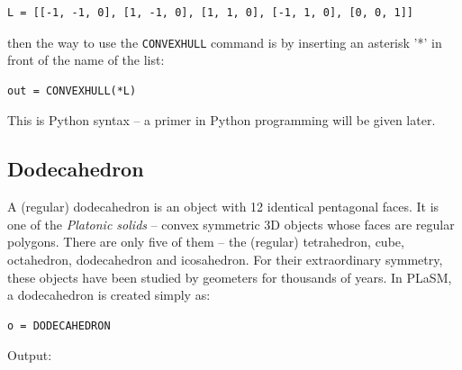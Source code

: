 \begin{bbox}
\begin{verbatim}
L = [[-1, -1, 0], [1, -1, 0], [1, 1, 0], [-1, 1, 0], [0, 0, 1]]
\end{verbatim}
\end{bbox}
\vspace{6mm}

\noindent
then the way to use the {\tt CONVEXHULL} command is by inserting 
an asterisk '*' in front of the name of the list: \\

\begin{bbox}
\begin{verbatim}
out = CONVEXHULL(*L)
\end{verbatim}
\end{bbox}
\vspace{6mm}

\noindent
This is Python syntax -- a primer in Python programming will be 
given later.

\subsection{Dodecahedron}

A (regular) dodecahedron is an object with 12 identical pentagonal 
faces. It is one of the {\em Platonic solids} -- convex symmetric 3D objects 
whose faces are regular polygons. There are only five of them
-- the (regular) tetrahedron, cube, octahedron, dodecahedron and icosahedron. 
For their extraordinary symmetry, these objects have been studied by 
geometers for thousands of years. In PLaSM, a dodecahedron is created simply as:\\

\begin{bbox}
\begin{verbatim}
o = DODECAHEDRON
\end{verbatim}
\end{bbox}
\vspace{6mm}

\noindent
Output:\\[-18mm]

